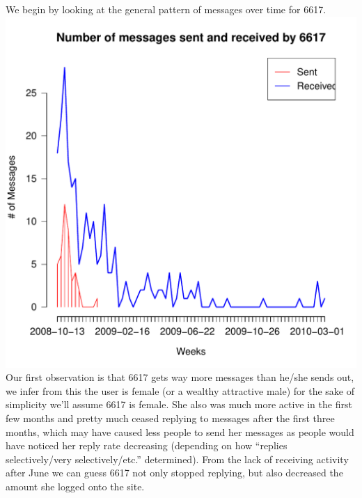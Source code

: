 \documentclass[a4paper,12pt]{article}
\begin{document}
We begin by looking at the general pattern of messages over time for 6617.  
\includegraphics[scale=.75]{p2/nummess.pdf}
Our first observation is that 6617 gets way more messages than he/she sends out, we infer from this the user is female (or a wealthy attractive male) for the sake of simplicity we'll assume 6617 is female.  She also was much more active in the first few months and pretty much ceased replying to messages after the first three months, which may have caused less people to send her messages as people would have noticed her reply rate decreasing (depending on how ``replies selectively/very selectively/etc.'' determined).  From the lack of receiving activity after June we can guess 6617 not only stopped replying, but also decreased the amount she logged onto the site.   
\end{document}
